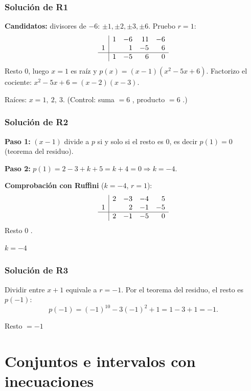 \documentclass[11pt,a4paper]{article}
\theoremstyle{ej}
\begin{document}
\subsubsection*{Solución de R1}
\textbf{Candidatos:} divisores de $-6$: $\pm1,\pm2,\pm3,\pm6$. Pruebo $r=1$:
\[
\begin{array}{r|rrrr}
 & 1 & -6 & 11 & -6\\
1 & & 1 & -5 & 6\\ \hline
 & 1 & -5 & 6 & 0
\end{array}
\]
Resto $0$, luego $x=1$ es raíz y $p(x)=(x-1)(x^2-5x+6)$. Factorizo el cociente: $x^2-5x+6=(x-2)(x-3)$.
\begin{respuesta}Raíces: $x=1,\ 2,\ 3$. (Control: suma $=6$ \checkmark, producto $=6$ \checkmark.)\end{respuesta}

\subsubsection*{Solución de R2}
\textbf{Paso 1:} $(x-1)$ divide a $p$ si y solo si el resto es $0$, es decir $p(1)=0$ (teorema del residuo).

\textbf{Paso 2:} $p(1)=2-3+k+5=k+4=0\Rightarrow k=-4$.

\textbf{Comprobación con Ruffini} ($k=-4$, $r=1$):
\[
\begin{array}{r|rrrr}
 & 2 & -3 & -4 & 5\\
1 & & 2 & -1 & -5\\ \hline
 & 2 & -1 & -5 & 0
\end{array}
\]
Resto $0$ \checkmark.
\begin{respuesta}$k=-4$\end{respuesta}

\subsubsection*{Solución de R3}
Dividir entre $x+1$ equivale a $r=-1$. Por el teorema del residuo, el resto es $p(-1)$:
\[ p(-1)=(-1)^{10}-3(-1)^2+1=1-3+1=-1. \]
\begin{respuesta}Resto $=-1$\end{respuesta}

\newpage
\section{Conjuntos e intervalos con inecuaciones}
\end{document}
